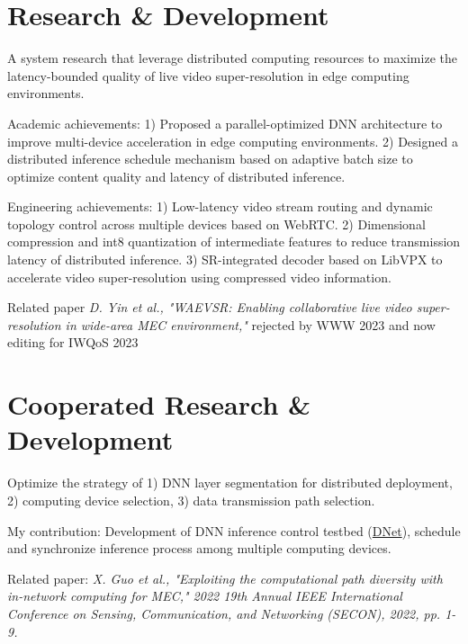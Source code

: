 \documentclass[]{deedy-resume-openfont}
\begin{document}
\begin{minipage}[t]{0.77\textwidth} 


\section{Research \& Development}
\vspace{\topsep}
\begin{tightemize}
    \item A system research that leverage distributed computing resources to maximize the latency-bounded quality of live video super-resolution in edge computing environments.
    \item Academic achievements: 
    1) Proposed a parallel-optimized DNN architecture to improve multi-device acceleration in edge computing environments. %
    2) Designed a distributed inference schedule mechanism based on adaptive batch size to optimize content quality and latency of distributed inference.
    \item Engineering achievements: 
    1) Low-latency video stream routing and dynamic topology control across multiple devices based on WebRTC.
    2) Dimensional compression and int8 quantization of intermediate features to reduce transmission latency of distributed inference. %
    3) SR-integrated decoder based on LibVPX to accelerate video super-resolution using compressed video information.
    \item Related paper \textit{D. Yin et al., "WAEVSR: Enabling collaborative live video super-resolution in wide-area MEC environment,"} rejected by WWW 2023 and now editing for IWQoS 2023
\end{tightemize}
\sectionsep


\section{Cooperated Research \& Development}
\begin{tightemize}
    \item Optimize the strategy of 1) DNN layer segmentation for distributed deployment, 2) computing device selection, 3) data transmission path selection.
    \item My contribution: Development of DNN inference control testbed (\href{https://github.com/yindaheng98/DNet}{DNet}), schedule and synchronize inference process among multiple computing devices.
    \item Related paper: \textit{X. Guo et al., "Exploiting the computational path diversity with in-network computing for MEC," 2022 19th Annual IEEE International Conference on Sensing, Communication, and Networking (SECON), 2022, pp. 1-9.}
\end{tightemize}
\sectionsep


\end{minipage}
\end{document}
